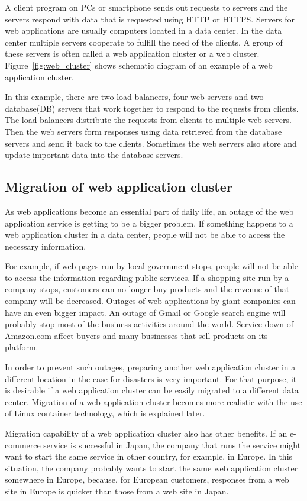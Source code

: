 A client program on PCs or smartphone sends out requests to servers and the servers respond with data that is requested using HTTP or HTTPS. 
Servers for web applications are usually computers located in a data center.
In the data center multiple servers cooperate to fulfill the need of the clients.
A group of these servers is often called a web application cluster or a web cluster.
Figure~\ref{fig:web_cluster} shows schematic diagram of an example of a web application cluster.

In this example, there are two load balancers, four web servers and two database(DB) servers that work together to respond to the requests from clients.
The load balancers distribute the requests from clients to multiple web servers.
Then the web servers form responses using data retrieved from the database servers and send it back to the clients.
Sometimes the web servers also store and update important data into the database servers.

\subsection{Migration of web application cluster}

As web applications become an essential part of daily life, an outage of the web application service is getting to be a bigger problem.
If something happens to a web application cluster in a data center, people will not be able to access the necessary information.

For example, if web pages run by local government stops, people will not be able to access the information regarding public services.
If a shopping site run by a company stops, customers can no longer buy products and the revenue of that company will be decreased.
Outages of web applications by giant companies can have an even bigger impact.
An outage of Gmail or Google search engine will probably stop most of the business activities around the world.
Service down of Amazon.com affect buyers and many businesses that sell products on its platform.

In order to prevent such outages, preparing another web application cluster in a different location in the case for disasters is very important.
For that purpose, it is desirable if a web application cluster can be easily migrated to a different data center.
Migration of a web application cluster becomes more realistic with the use of Linux container technology, which is explained later.

Migration capability of a web application cluster also has other benefits.
If an e-commerce service is successful in Japan, the company that runs the service might want to start the same service in other country, for example, in Europe.
In this situation, the company probably wants to start the same web application cluster somewhere in Europe, because, for European customers, responses from a web site in Europe is quicker than those from a web site in Japan.

